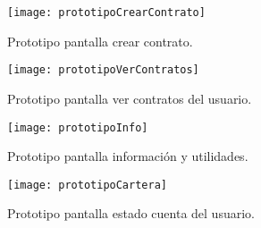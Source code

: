 \begin{figure}[h]
	\label{img:prototipoCrearContrato}
	\centering
	\texttt{[image: prototipoCrearContrato]}
	\caption[Prototipo pantalla crear contrato]{Prototipo pantalla crear contrato.}
\end{figure}

\begin{figure}[h]
	\label{img:prototipoVerContratos}
	\centering
	\texttt{[image: prototipoVerContratos]}
	\caption[Prototipo pantalla ver contratos del usuario]{Prototipo pantalla ver contratos del usuario.}
\end{figure}

\begin{figure}[h]
	\label{img:prototipoInfo}
	\centering
	\texttt{[image: prototipoInfo]}
	\caption[Prototipo pantalla información y utilidades]{Prototipo pantalla información y utilidades.}
\end{figure}

\begin{figure}[h]
	\label{img:prototipoCartera}
	\centering
	\texttt{[image: prototipoCartera]}
	\caption[Prototipo pantalla estado cuenta del usuario]{Prototipo pantalla estado cuenta del usuario.}
\end{figure}

